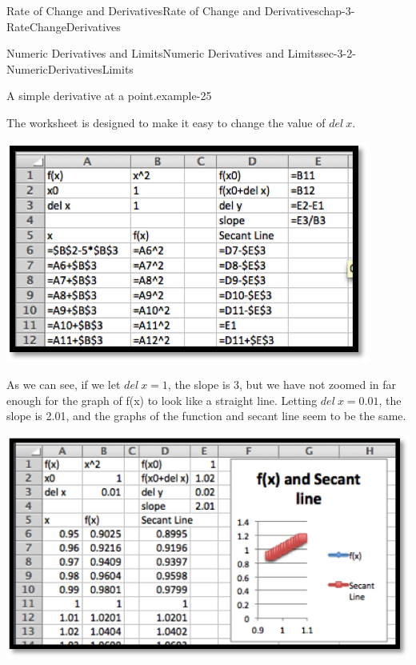 \documentclass[oneside,10pt,]{book}
\numberwithin{equation}{section}
\begin{document}
\begin{chapterptx}{Rate of Change and Derivatives}{}{Rate of Change and Derivatives}{}{}{chap-3-RateChangeDerivatives}
\begin{sectionptx}{Numeric Derivatives and Limits}{}{Numeric Derivatives and Limits}{}{}{sec-3-2-NumericDerivativesLimits}
\begin{example}{A simple derivative at a point.}{example-25}
\begin{sidebyside}{1}{0.15}{0.15}{0}
\begin{sbspanel}{0.7}
\end{sbspanel}%
\end{sidebyside}%
\par
\hypertarget{p-1023}{}%
The worksheet is designed to make it easy to change the value of \(del\ x\).%
\begin{sidebyside}{1}{0.15}{0.15}{0}%
\begin{sbspanel}{0.7}%
\includegraphics[width=1\linewidth]{images/sec3-2-2.png}
\end{sbspanel}%
\end{sidebyside}%
\par
\hypertarget{p-1024}{}%
As we can see, if we let \(del\ x=1\), the slope is 3, but we have not zoomed in far enough for the graph of f(x) to look like a straight line.  Letting \(del\ x=0.01\), the slope is 2.01, and the graphs of the function and secant line seem to be the same.%
\begin{sidebyside}{1}{0.15}{0.15}{0}%
\begin{sbspanel}{0.7}%
\includegraphics[width=1\linewidth]{images/sec3-2-3.png}
\end{sbspanel}%

\end{sidebyside}
\end{example}
\end{sectionptx}
\end{chapterptx}
\end{document}
